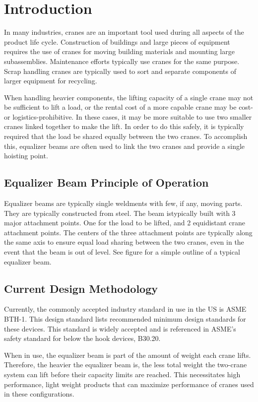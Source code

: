 \chapter{Introduction}
In many industries, cranes are an important tool used during all aspects of the product life cycle. Construction of buildings and large pieces of equipment requires the use of cranes for moving building materials and mounting large subassemblies. Maintenance efforts typically use cranes for the same purpose. Scrap handling cranes are typically used to sort and separate components of larger equipment for recycling.

When handling heavier components, the lifting capacity of a single crane may not be sufficient to lift a load, or the rental cost of a more capable crane may be cost- or logistics-prohibitive. In these cases, it may be more suitable to use two smaller cranes linked together to make the lift. In order to do this safely, it is typically required that the load be shared equally between the two cranes. To accomplish this, equalizer beams are often used to link the two cranes and provide a single hoisting point.

\section{Equalizer Beam Principle of Operation} 

Equalizer beams are typically single weldments with few, if any, moving parts. They are typically constructed from steel. The beam istypically built with 3 major attachment points. One for the load to be lifted, and 2 equidistant crane attachment points. The centers of the three attachment points are typically along the same axis to ensure equal load sharing between the two cranes, even in the event that the beam is out of level. See figure  for a simple outline of a typical equalizer beam.

\section{Current Design Methodology}

Currently, the commonly accepted industry standard in use in the US is ASME BTH-1. This design standard lists recommended minimum design standards for these devices. This standard is widely accepted and is referenced in ASME's safety standard for below the hook devices, B30.20.

When in use, the equalizer beam is part of the amount of weight each crane lifts. Therefore, the heavier the equalizer beam is, the less total weight the two-crane system can lift before their capacity limits are reached. This necessitates high performance, light weight products that can maximize performance of cranes used in these configurations.  
